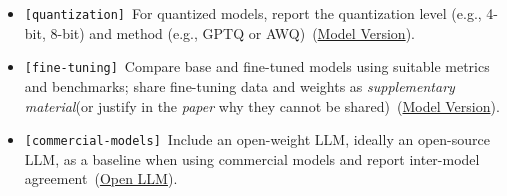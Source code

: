 \documentclass[smallextended]{svjour3}
\makeatletter
\newcommand{\should}{\textbf{should}\xspace}
\newcommand{\paper}{\emph{paper}\xspace}
\newcommand{\supplementarymaterial}{\emph{supplementary material}\xspace}
\newcommand{\paper}{\emph{paper}\xspace}
\newcommand{\supplementarymaterial}{\emph{supplementary material}\xspace}
\newcommand{\iconS}{\usebox{\iconSbox}\xspace}
\newcommand{\iconS}{○\xspace}
\newcommand{\condition}[1]{\texttt{\small[#1]}\,}
\newcommand{\condition}[1]{@@cond:#1@@}
\newcommand{\refmodelversion}{\hyperref[sec:report-model-version-configuration-and-customizations]{Model Version}}
\newcommand{\refopenllm}{\hyperref[sec:use-an-open-llm-as-a-baseline]{Open LLM}}
\newcommand{\refmodelversion}{\href{/guidelines/model-version/}{Model Version}}
\newcommand{\refopenllm}{\href{/guidelines/open-llm/}{Open LLM}}
\makeatother
\begin{document}
\begin{appendices}
\begin{itemize}[label={},leftmargin=*]
    \item \iconS \condition{quantization} For quantized models, report the quantization level (e.g., 4-bit, 8-bit) and method (e.g., GPTQ or AWQ)~(\refmodelversion).
    \item \iconS \condition{fine-tuning} Compare base and fine-tuned models using suitable metrics and benchmarks; share fine-tuning data and weights as \supplementarymaterial (or justify in the \paper why they cannot be shared)~(\refmodelversion).
    \item \iconS \condition{commercial-models} Include an open-weight LLM, ideally an open-source LLM, as a baseline when using commercial models and report inter-model agreement~(\refopenllm).
\end{itemize}


\end{appendices}
\end{document}
